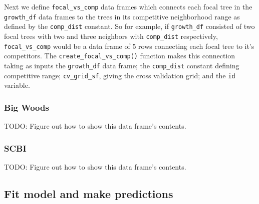 \documentclass[12pt]{article}
\newenvironment{Shaded}{\begin{snugshade}}{\end{snugshade}}
\newcommand{\DataTypeTok}[1]{\textcolor[rgb]{0.13,0.29,0.53}{#1}}
\newcommand{\KeywordTok}[1]{\textcolor[rgb]{0.13,0.29,0.53}{\textbf{#1}}}
\newcommand{\NormalTok}[1]{#1}
\newcommand{\OperatorTok}[1]{\textcolor[rgb]{0.81,0.36,0.00}{\textbf{#1}}}
\newcommand{\StringTok}[1]{\textcolor[rgb]{0.31,0.60,0.02}{#1}}
\begin{document}
Next we define \texttt{focal\_vs\_comp} data frames which connects each
focal tree in the \texttt{growth\_df} data frames to the trees in its
competitive neighborhood range as defined by the \texttt{comp\_dist}
constant. So for example, if \texttt{growth\_df} consisted of two focal
trees with two and three neighbors with \texttt{comp\_dist}
respectively, \texttt{focal\_vs\_comp} would be a data frame of 5 rows
connecting each focal tree to it's competitors. The
\texttt{create\_focal\_vs\_comp()} function makes this connection taking
as inputs the \texttt{growth\_df} data frame; the \texttt{comp\_dist}
constant defining competitive range; \texttt{cv\_grid\_sf}, giving the
cross validation grid; and the \texttt{id} variable.

\hypertarget{big-woods-3}{%
\subsubsection{Big Woods}\label{big-woods-3}}

\begin{Shaded}
\end{Shaded}

TODO: Figure out how to show this data frame's contents.

\hypertarget{scbi-2}{%
\subsubsection{SCBI}\label{scbi-2}}

\begin{Shaded}
\end{Shaded}

TODO: Figure out how to show this data frame's contents.

\hypertarget{model-fit-predict}{%
\subsection{Fit model and make predictions}\label{model-fit-predict}}
\end{document}
